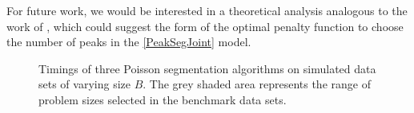 \documentclass{article} %
\begin{document}
For future work, we would be interested in a theoretical analysis
analogous to the work of \citet{cleynen2013segmentation}, which could
suggest the form of the optimal penalty function to choose the number
of peaks in the \ref{PeakSegJoint} model.

\begin{figure}[b!]
  \centering
  
  \vskip -0.5cm
  \caption{Timings of three Poisson segmentation algorithms on
    simulated data sets of varying size $B$. The grey shaded area
    represents the range of problem sizes selected in the 
     benchmark data sets. }
  \label{fig:timings}
\end{figure}

\newpage




\end{document}
